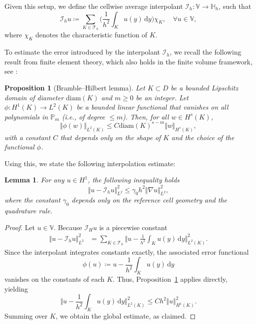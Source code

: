 \documentclass[11pt, a4paper]{amsart}
\newcommand{\dd}{\,\mathrm{d}}
\newcommand{\mT}{\mathcal{T}}
\newcommand{\HH}{\mathbb{H}}
\newcommand{\VV}{\mathbb{V}}
\newcommand{\mI}{\mathcal{I}}
\newtheorem{lemma}[theorem]{Lemma}%
\newtheorem{proposition}[theorem]{Proposition}%
\numberwithin{equation}{section}
\begin{document}
	
	

	Given this setup, we define the cellwise average  interpolant $\mI_h: \VV\rightarrow \HH_h$, such that
	\begin{equation*}
		\mI_h u\coloneqq\sum_{K\in\mT_h}\bigg(\frac{1}{h^2}\int_K u(y)\dd y\bigg)\chi_{K},\quad\forall u\in \VV,
	\end{equation*}
	where $\chi_{K}$ denotes the characteristic function of $K$.
	
	To estimate the error introduced by the interpolant $\mI_h$, we recall the following result from finite element theory, which also holds in the finite volume framework, see \cite[Theorem 4.4.4 ]{brenner2008mathematical}:
	\begin{proposition}[Bramble--Hilbert lemma]\label{prop:bramble_hilbert_lemma}
		Let $K\subset D$ be a bounded Lipschitz domain of diameter $\mathrm{diam}(K)$ and $m\geq 0$ be an integer. Let $\phi:H^1(K)\rightarrow L^2(K)$ be a bounded linear functional that vanishes on all polynomials in $\mathbb{P}_m$ (i.e., of degree $\leq m$). Then, for all $w\in H^s(K)$,
		\begin{equation*}
			\Vert \phi(w)\Vert_{L^2(K)}\leq C\mathrm{diam}(K)^{s-m}\Vert w\Vert_{H^s(K)},
		\end{equation*}
		with a constant $C$ that depends only on the shape of $K$ and the choice of the functional $\phi$.
	\end{proposition}
	
	Using this, we state the following interpolation estimate:
	\begin{lemma}\label{lem:approx_pty}
		For any $u\in H^1$, the following inequality holds
		\begin{equation*}
			\Vert u-\mI_h u\Vert_{L^2}^2\leq \gamma_0h^2\Vert\nabla u\Vert^2_{L^2},
		\end{equation*}
		where the constant $\gamma_0$ depends only on the reference cell geometry and the quadrature rule.
	\end{lemma}
	\begin{proof}
		Let $u\in \VV$. Because $\mI_Hu$ is a piecewise constant
		\begin{align*}
			\Vert u-\mI_h u\Vert_{L^2}^2&= \sum_{K\in\mT_h} \Big\Vert u - \frac{1}{h^2}\int_K u(y)\dd y \Big\Vert_{L^2(K)}^2.
		\end{align*}
		Since the interpolant integrates constants exactly, the associated error functional
		\begin{equation*}
			\phi(u)\coloneqq u - \frac{1}{h^2}\int_K u(y)\dd y
		\end{equation*}
		vanishes on the constants of each $K$. Thus, Proposition~\ref{prop:bramble_hilbert_lemma} applies directly, yielding
		\begin{equation*}%
			\Big\Vert u - \frac{1}{h^2}\int_K u(y)\dd y \Big\Vert_{L^2(K)}^2\leq Ch^{2}\Vert u\Vert_{H^1(K)}^2.
		\end{equation*}
		Summing over $K$,  we obtain the global estimate, as claimed.
	\end{proof}
	
\end{document}
